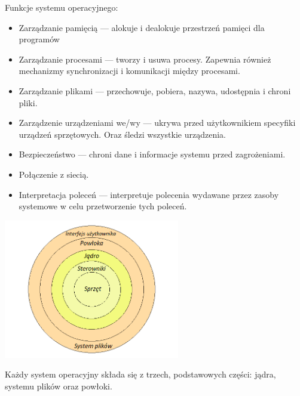 \documentclass[10pt,a4paper]{report}
\begin{document}
\begin{adjustwidth}{2cm}{2cm}
\begin{minipage}{1\linewidth}
\end{minipage}
Funkcje systemu operacyjnego: \\
\begin{adjustwidth}{0.5cm}{0cm}
\begin{minipage}{1\linewidth}
\begin{itemize}
\setlength\itemsep{0.2cm}
    \item[\ding{118}]  Zarządzanie pamięcią — alokuje i dealokuje przestrzeń pamięci dla programów
    \item[\ding{118}]  Zarządzanie procesami — tworzy i usuwa procesy. Zapewnia również mechanizmy synchronizacji i komunikacji między procesami.
    \item[\ding{118}] Zarządzanie plikami — przechowuje, pobiera, nazywa, udostępnia i chroni pliki.
    \item[\ding{118}] Zarządzenie urządzeniami we/wy — ukrywa przed użytkownikiem specyfiki urządzeń sprzętowych. Oraz śledzi wszystkie urządzenia.
    \item[\ding{118}] Bezpieczeństwo — chroni dane i informacje systemu przed zagrożeniami.
    \item[\ding{118}] Połączenie z siecią. 
    \item[\ding{118}] Interpretacja poleceń — interpretuje polecenia wydawane przez zasoby systemowe w celu przetworzenie tych poleceń.
\end{itemize}
\end{minipage}
\end{adjustwidth}
 \begin{minipage}{\linewidth}
\begin{center}
  \includegraphics[width=290px]{img/system}
\end{center}
\end{minipage}
\begin{minipage}{1\linewidth}
Każdy system operacyjny składa się z trzech, podstawowych części: jądra, systemu plików oraz powłoki.
\end{minipage}

\end{adjustwidth}
\end{document}
